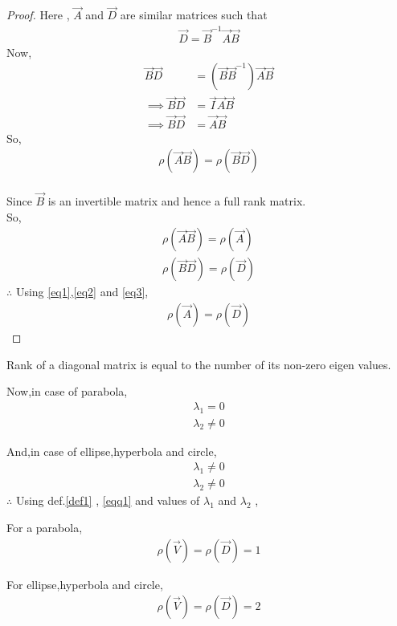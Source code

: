 \documentclass[journal,12pt,twocolumn]{IEEEtran}
\begin{document}
\begin{proof}
Here , $\vec{A}$ and $\vec{D}$ are similar matrices such that 
\begin{align}
    \vec{D} = \vec{B}^{-1}\vec{A}\vec{B}
\end{align}
Now,
\begin{align}
    \vec{B}\vec{D} &= (\vec{B}\vec{B}^{-1})\vec{A}\vec{B}
    \\
    \implies \vec{B}\vec{D} &= \vec{I}\vec{A}\vec{B}
    \\
    \implies \vec{B}\vec{D} &= \vec{A}\vec{B}
\end{align}
So,
\begin{align}
    \rho(\vec{A}\vec{B}) = \rho(\vec{B}\vec{D}) \label{eq1}
\end{align}
\\
Since $\vec{B}$ is an invertible matrix and hence a full rank matrix.
\\
So,
\begin{align}
    \rho(\vec{A}\vec{B}) = \rho(\vec{A}) \label{eq2}
    \\
    \rho(\vec{B}\vec{D}) = \rho(\vec{D}) \label{eq3}
\end{align}
$\therefore$ Using \eqref{eq1},\eqref{eq2} and \eqref{eq3},
\begin{align}
    \rho(\vec{A}) = \rho(\vec{D})
\end{align}
\end{proof}

\begin{definition}
Rank of a diagonal matrix is equal to the number of its non-zero eigen values. \label{def1}
\end{definition}

Now,in case of parabola, 
\begin{align}
    \lambda_1 =0 
    \\
    \lambda_2 \neq 0 
\end{align}

And,in case of ellipse,hyperbola and circle, \label{result2}
\begin{align}
    \lambda_1 \neq 0 
    \\
    \lambda_2 \neq 0 
\end{align}
$\therefore$
Using def.\ref{def1} , \eqref{eqq1} and values of $\lambda_1$ and $\lambda_2$ ,

For a parabola,
\begin{align}
    \rho(\vec{V}) = \rho(\vec{D}) = 1
\end{align}

For ellipse,hyperbola and circle,
\begin{align}
    \rho(\vec{V}) = \rho(\vec{D}) = 2
\end{align}
\end{document}

